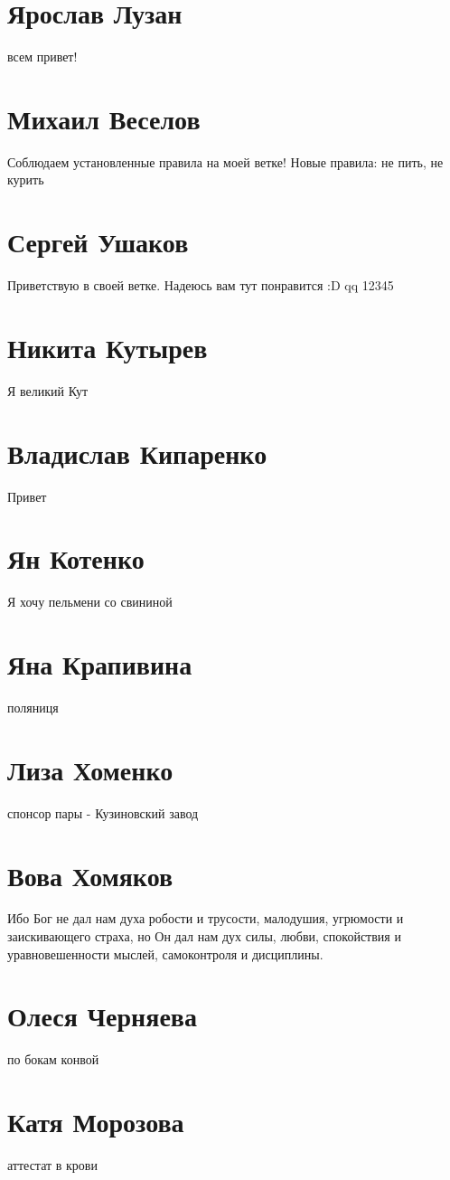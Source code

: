 \documentclass{article}
\begin{document}
\section*{Ярослав Лузан}
всем привет!
\section*{Михаил Веселов}

Соблюдаем установленные правила на моей ветке!
Новые правила: не пить, не курить

\section*{Сергей Ушаков}

Приветствую в своей ветке. Надеюсь вам тут понравится :D qq 12345

\section*{Никита Кутырев}
Я великий Кут
\section*{Владислав Кипаренко}
Привет
\section*{Ян Котенко}
Я хочу пельмени со свининой
\section*{Яна Крапивина}

поляниця
\section*{Лиза Хоменко}
спонсор пары - Кузиновский завод

\section*{Вова Хомяков}
Ибо Бог не дал нам духа робости и трусости, малодушия, угрюмости и заискивающего страха, но Он дал нам дух силы, любви, спокойствия и уравновешенности мыслей, самоконтроля и дисциплины.
\section*{Олеся Черняева}
по бокам конвой

\section*{Катя Морозова}
аттестат в крови
\end{document}
